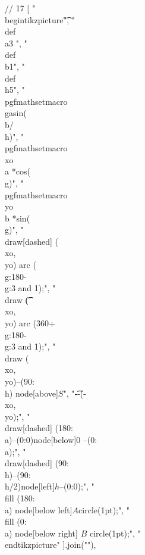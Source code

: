 // 17
[
"\\begin{tikzpicture}\t",
"\t\\def\\a{3} ",
"\t\\def\\b{1}",
"\t\\def\\h{5}",
"\t\\pgfmathsetmacro\\g{asin(\\b/\\h)}",
"\t\\pgfmathsetmacro\\xo{\\a *cos(\\g)}",
"\t\\pgfmathsetmacro\\yo{\\b *sin(\\g)}",
"\t\\draw[dashed] (\\xo,\\yo)  arc (\\g:180-\\g:{3} and {1});",
"\t\\draw \t\t  (\\xo,\\yo) arc (360+\\g:180-\\g:{3} and {1});",
"\t\\draw (\\xo,\\yo)--(90:\\h) node[above]{$S$}",
"\t--(-\\xo,\\yo);",
"\t\\draw[dashed] (180:\\a)--(0:0)node[below]{0} --(0:\\a);",
"\t\\draw[dashed] (90:\\h)--(90:\\h/2)node[left]{$h$}--(0:0);",
"\t\\fill (180:\\a) node[below left]{$A$}circle(1pt);",
"\t\\fill  (0:\\a) node[below right] {$B$} circle(1pt);",
"\\end{tikzpicture}"
].join("\n"),

